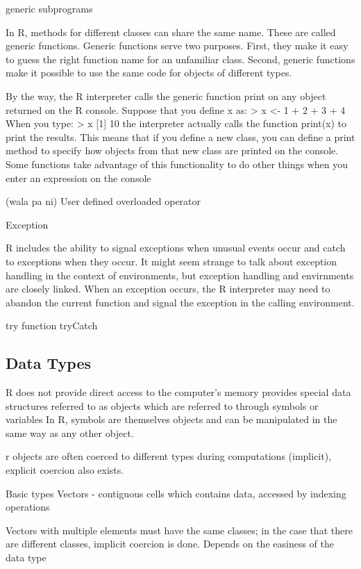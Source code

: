 \documentclass[12pt]{article}
\begin{document}
generic subprograms

In R, methods for different classes can share the same name. These are called generic
functions. Generic functions serve two purposes. First, they make it easy to guess
the right function name for an unfamiliar class. Second, generic functions make it
possible to use the same code for objects of different types.

By the way, the R interpreter calls the generic function print on any object returned
on the R console. Suppose that you define x as:
> x <- 1 + 2 + 3 + 4
When you type:
> x
[1] 10
the interpreter actually calls the function print(x) to print the results. This means
that if you define a new class, you can define a print method to specify how objects
from that new class are printed on the console. Some functions take advantage of
this functionality to do other things when you enter an expression on the console

(wala pa ni)
User defined overloaded operator


Exception

R includes the ability to signal exceptions when unusual events occur and catch to exceptions when they occur. It might seem strange to talk about exception handling in the context of environments, but exception handling and envirnments are closely linked. When an exception occurs, the R interpreter may need to abandon the current function and signal the exception in the calling environment.

try function
tryCatch

\iffalse
\subsection{Data Types}
R does not provide direct access to the computer's memory
provides special data structures referred to as objects
which are referred to through symbols or variables
In R, symbols are themselves objects and can be manipulated in the same way as any other object.

r objects are often coerced to different types during computations (implicit), explicit coercion also exists.

Basic types
Vectors - contiguous cells which contains data, accessed by indexing operations

Vectors with multiple elements must have the same classes; in the case that there are different classes, implicit coercion is done. Depends on the easiness of the data type
\end{document}
